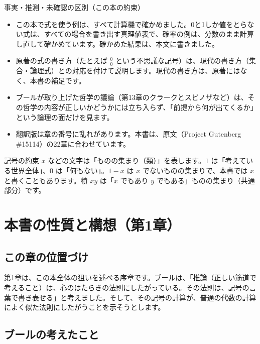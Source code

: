 \documentclass[a4paper,11pt,openany]{ltjsbook}
\newcommand{\nx}[1]{\overline{#1}}
\begin{document}
\begin{notebox}{事実・推測・未確認の区別（この本の約束）}
\begin{itemize}[leftmargin=*]
\item この本で式を使う例は、すべて計算機で確かめました。0と1しか値をとらない式は、すべての場合を書き出す真理値表で、確率の例は、分数のまま計算し直して確かめています。確かめた結果は、本文に書きました。
\item 原著の式の書き方（たとえば $\tfrac00$ という不思議な記号）は、現代の書き方（集合・論理式）との対応を付けて説明します。現代の書き方は、原著にはなく、本書の補足です。
\item ブールが取り上げた哲学の議論（第13章のクラークとスピノザなど）は、その哲学の内容が正しいかどうかには立ち入らず、「前提から何が出てくるか」という論理の面だけを見ます。
\item 翻訳版は章の番号に乱れがあります。本書は、原文（Project Gutenberg \#15114）の22章に合わせています。
\end{itemize}
\end{notebox}

\begin{pointbox}{記号の約束}
$x$ などの文字は「ものの集まり（類）」を表します。$1$ は「考えている世界全体」、$0$ は「何もない」。$1-x$ は $x$ でないものの集まりで、本書では $\nx{x}$ と書くこともあります。積 $xy$ は「$x$ でもあり $y$ でもある」ものの集まり（共通部分）です。
\end{pointbox}

\chapter{本書の性質と構想（第1章）}

\section{この章の位置づけ}

第1章は、この本全体の狙いを述べる序章です。ブールは、「推論（正しい筋道で考えること）は、心のはたらきの法則にしたがっている。その法則は、記号の言葉で書き表せる」と考えました。そして、その記号の計算が、普通の代数の計算によく似た法則にしたがうことを示そうとします。

\section{ブールの考えたこと}
\end{document}
